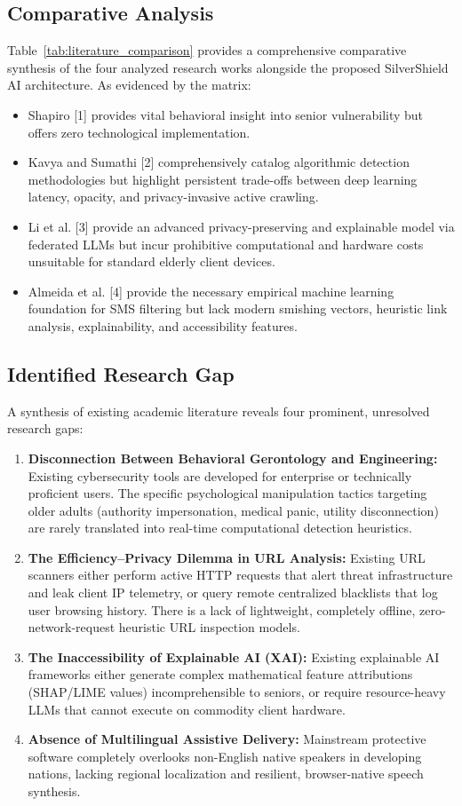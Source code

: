 \documentclass[conference]{IEEEtran}
\begin{document}
\subsection{Comparative Analysis}
Table~\ref{tab:literature_comparison} provides a comprehensive comparative synthesis of the four analyzed research works alongside the proposed SilverShield AI architecture. As evidenced by the matrix:
\begin{itemize}
    \item Shapiro [1] provides vital behavioral insight into senior vulnerability but offers zero technological implementation.
    \item Kavya and Sumathi [2] comprehensively catalog algorithmic detection methodologies but highlight persistent trade-offs between deep learning latency, opacity, and privacy-invasive active crawling.
    \item Li et al. [3] provide an advanced privacy-preserving and explainable model via federated LLMs but incur prohibitive computational and hardware costs unsuitable for standard elderly client devices.
    \item Almeida et al. [4] provide the necessary empirical machine learning foundation for SMS filtering but lack modern smishing vectors, heuristic link analysis, explainability, and accessibility features.
\end{itemize}

\subsection{Identified Research Gap}
A synthesis of existing academic literature reveals four prominent, unresolved research gaps:
\begin{enumerate}
    \item \textbf{Disconnection Between Behavioral Gerontology and Engineering:} Existing cybersecurity tools are developed for enterprise or technically proficient users. The specific psychological manipulation tactics targeting older adults (authority impersonation, medical panic, utility disconnection) are rarely translated into real-time computational detection heuristics.
    \item \textbf{The Efficiency--Privacy Dilemma in URL Analysis:} Existing URL scanners either perform active HTTP requests that alert threat infrastructure and leak client IP telemetry, or query remote centralized blacklists that log user browsing history. There is a lack of lightweight, completely offline, zero-network-request heuristic URL inspection models.
    \item \textbf{The Inaccessibility of Explainable AI (XAI):} Existing explainable AI frameworks either generate complex mathematical feature attributions (SHAP/LIME values) incomprehensible to seniors, or require resource-heavy LLMs that cannot execute on commodity client hardware.
    \item \textbf{Absence of Multilingual Assistive Delivery:} Mainstream protective software completely overlooks non-English native speakers in developing nations, lacking regional localization and resilient, browser-native speech synthesis.
\end{enumerate}
\end{document}
